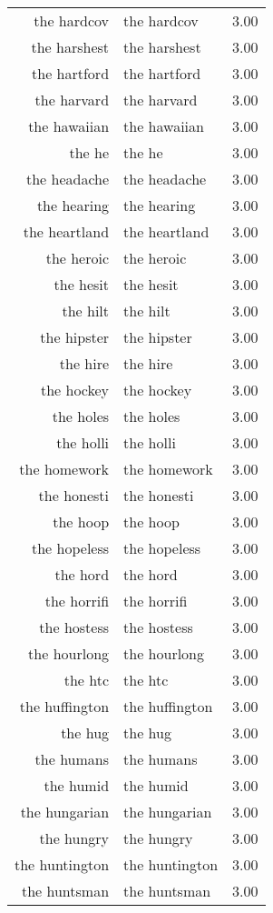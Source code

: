 \begin{table}[ht]
\begin{tabular}{rlr}
  the hardcov & the hardcov & 3.00 \\ 
  the harshest & the harshest & 3.00 \\ 
  the hartford & the hartford & 3.00 \\ 
  the harvard & the harvard & 3.00 \\ 
  the hawaiian & the hawaiian & 3.00 \\ 
  the he & the he & 3.00 \\ 
  the headache & the headache & 3.00 \\ 
  the hearing & the hearing & 3.00 \\ 
  the heartland & the heartland & 3.00 \\ 
  the heroic & the heroic & 3.00 \\ 
  the hesit & the hesit & 3.00 \\ 
  the hilt & the hilt & 3.00 \\ 
  the hipster & the hipster & 3.00 \\ 
  the hire & the hire & 3.00 \\ 
  the hockey & the hockey & 3.00 \\ 
  the holes & the holes & 3.00 \\ 
  the holli & the holli & 3.00 \\ 
  the homework & the homework & 3.00 \\ 
  the honesti & the honesti & 3.00 \\ 
  the hoop & the hoop & 3.00 \\ 
  the hopeless & the hopeless & 3.00 \\ 
  the hord & the hord & 3.00 \\ 
  the horrifi & the horrifi & 3.00 \\ 
  the hostess & the hostess & 3.00 \\ 
  the hourlong & the hourlong & 3.00 \\ 
  the htc & the htc & 3.00 \\ 
  the huffington & the huffington & 3.00 \\ 
  the hug & the hug & 3.00 \\ 
  the humans & the humans & 3.00 \\ 
  the humid & the humid & 3.00 \\ 
  the hungarian & the hungarian & 3.00 \\ 
  the hungry & the hungry & 3.00 \\ 
  the huntington & the huntington & 3.00 \\ 
  the huntsman & the huntsman & 3.00 \\ 

\end{tabular}
\end{table}
